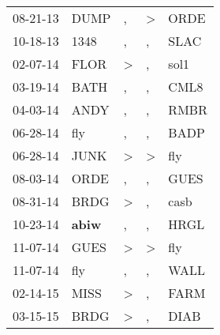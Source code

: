 \begin{supertabular}{p{0.07\textwidth}p{0.06\textwidth}p{0.02\textwidth}p{0.02\textwidth}p{0.06\textwidth}}
          08-21-13\textsuperscript{} &           DUMP\textsuperscript{} &                , &     \textgreater &           ORDE\textsuperscript{} \\
          10-18-13\textsuperscript{} &           1348\textsuperscript{} &                , &                , &           SLAC\textsuperscript{} \\
          02-07-14\textsuperscript{} &           FLOR\textsuperscript{} &     \textgreater &                , &           sol1\textsuperscript{} \\
          03-19-14\textsuperscript{} &           BATH\textsuperscript{} &                , &                , &           CML8\textsuperscript{} \\
          04-03-14\textsuperscript{} &           ANDY\textsuperscript{} &                , &                , &           RMBR\textsuperscript{} \\
          06-28-14\textsuperscript{} &            fly\textsuperscript{} &                , &                , &           BADP\textsuperscript{} \\
          06-28-14\textsuperscript{} &           JUNK\textsuperscript{} &     \textgreater &     \textgreater &            fly\textsuperscript{} \\
          08-03-14\textsuperscript{} &           ORDE\textsuperscript{} &                , &                , &           GUES\textsuperscript{} \\
          08-31-14\textsuperscript{} &           BRDG\textsuperscript{} &     \textgreater &                , &           casb\textsuperscript{} \\
          10-23-14\textsuperscript{} &  \textbf{abiw\textsuperscript{}} &                , &                , &           HRGL\textsuperscript{} \\
          11-07-14\textsuperscript{} &           GUES\textsuperscript{} &     \textgreater &     \textgreater &            fly\textsuperscript{} \\
          11-07-14\textsuperscript{} &            fly\textsuperscript{} &                , &                , &           WALL\textsuperscript{} \\
          02-14-15\textsuperscript{} &           MISS\textsuperscript{} &     \textgreater &                , &           FARM\textsuperscript{} \\
          03-15-15\textsuperscript{} &           BRDG\textsuperscript{} &     \textgreater &                , &           DIAB\textsuperscript{} \\

\end{supertabular}
